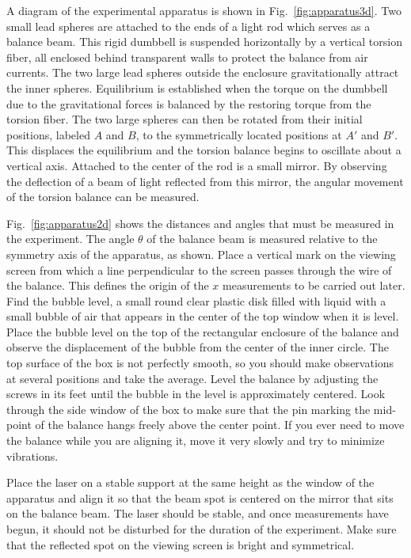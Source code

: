 \documentclass{revtex4}
\begin{document}
A diagram of the experimental apparatus is shown in 
Fig.~\ref{fig:apparatus3d}.  Two small lead spheres are attached to
the ends of a light rod which serves as a balance beam.
This rigid dumbbell is suspended horizontally by a vertical
torsion fiber, all enclosed behind transparent walls to protect
the balance from air currents.
The two large lead spheres outside the enclosure gravitationally
attract the inner spheres. Equilibrium is established when the
torque on the dumbbell due to the gravitational forces is
balanced by the restoring torque from the torsion fiber. The
two large spheres can then be rotated from their initial
positions, labeled $A$ and $B$, to the symmetrically located
positions at $A'$ and $B'$. This displaces the equilibrium and the
torsion balance begins to oscillate about a vertical axis.
Attached to the center of the rod is a small mirror. By
observing the deflection of a beam of light reflected from this
mirror, the angular movement of the torsion balance can be
measured.

Fig.~\ref{fig:apparatus2d} shows the distances and angles that must
be measured in the experiment.  The angle $\theta$ of the balance beam
is measured relative to the symmetry axis of the apparatus, as shown.
Place a vertical mark on the viewing screen from which a line perpendicular
to the screen passes through the wire of the balance.  This defines the
origin of the $x$ measurements to be carried out later.  Find the bubble
level, a small round clear plastic disk filled with liquid with a small
bubble of air that appears in the center of the top window when it is level.
Place the bubble level on the top of the rectangular enclosure of the
balance and observe the displacement of the bubble from the center of
the inner circle.  The top surface of the box is not perfectly smooth,
so you should make observations at several positions and take the average.
Level the balance by adjusting the screws in its feet until the bubble in
the level is approximately centered.  Look through the side window of the
box to make sure that the pin marking the mid-point of the balance hangs
freely above the center point.  If you ever need to move the balance while
you are aligning it, move it very slowly and try to minimize vibrations.

Place the laser on a stable support at the same height as the window of
the apparatus and align it so that the beam spot is centered on the mirror
that sits on the balance beam.  The laser should be stable, and once
measurements have begun, it should not be disturbed for the duration
of the experiment.  Make sure that the reflected spot on the viewing
screen is bright and symmetrical.
\end{document}
